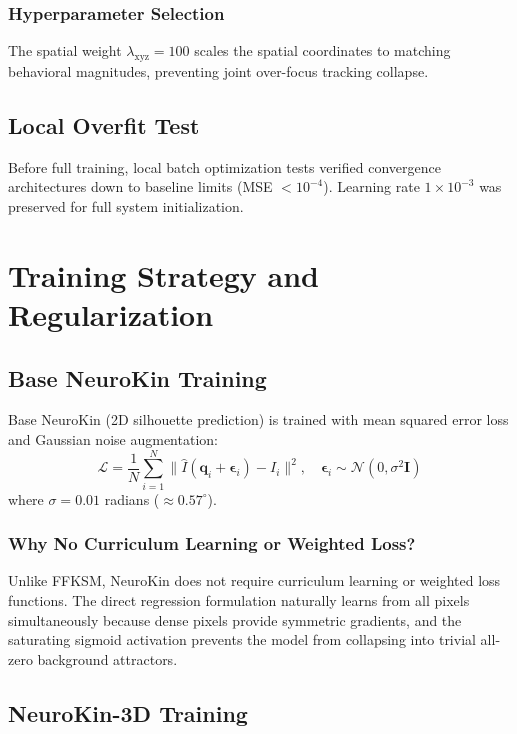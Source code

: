 \documentclass[12pt,a4paper,oneside]{report}
\begin{document}
\subsubsection{Hyperparameter Selection}

The spatial weight $\lambda_{\text{xyz}} = 100$ scales the spatial coordinates to matching behavioral magnitudes, preventing joint over-focus tracking collapse.

\subsection{Local Overfit Test}

Before full training, local batch optimization tests verified convergence architectures down to baseline limits (MSE $< 10^{-4}$). Learning rate $1 \times 10^{-3}$ was preserved for full system initialization.

\section{Training Strategy and Regularization}

\subsection{Base NeuroKin Training}

Base NeuroKin (2D silhouette prediction) is trained with mean squared error loss and Gaussian noise augmentation:
\begin{equation}
\mathcal{L} = \frac{1}{N} \sum_{i=1}^{N} \|\hat{I}(\mathbf{q}_i + \boldsymbol{\epsilon}_i) - I_i\|^2, \quad \boldsymbol{\epsilon}_i \sim \mathcal{N}(0, \sigma^2 \mathbf{I})
\end{equation}
where $\sigma = 0.01$ radians ($\approx 0.57^\circ$).

\subsubsection{Why No Curriculum Learning or Weighted Loss?}

Unlike FFKSM, NeuroKin does not require curriculum learning or weighted loss functions. The direct regression formulation naturally learns from all pixels simultaneously because dense pixels provide symmetric gradients, and the saturating sigmoid activation prevents the model from collapsing into trivial all-zero background attractors.

\subsection{NeuroKin-3D Training}
\end{document}
